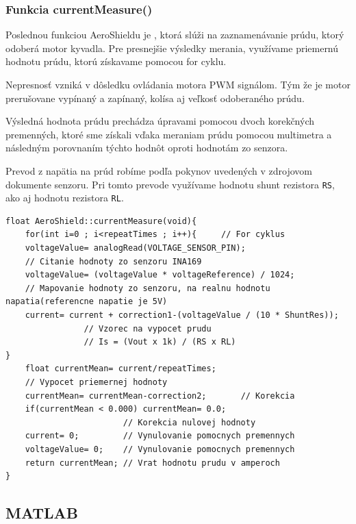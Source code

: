 	
\subsubsection{Funkcia currentMeasure()}	
	
Poslednou funkciou AeroShieldu je , ktorá slúži na zaznamenávanie prúdu, ktorý odoberá motor kyvadla. Pre presnejšie výsledky merania, využívame priemernú hodnotu prúdu, ktorú získavame pomocou for cyklu. 

Nepresnosť vzniká v dôsledku ovládania motora PWM signálom. Tým že je motor prerušovane vypínaný a zapínaný, kolísa aj veľkosť odoberaného prúdu. 

Výsledná hodnota prúdu prechádza úpravami pomocou dvoch korekčných premenných, ktoré sme získali vďaka meraniam prúdu pomocou multimetra a následným porovnaním týchto hodnôt oproti hodnotám zo senzora. 

Prevod z napätia na prúd robíme podľa pokynov uvedených v zdrojovom dokumente senzoru. Pri tomto prevode využívame hodnotu shunt rezistora \verb|RS|, ako aj hodnotu rezistora \verb|RL|. 
  
	
\begin{lstlisting}[caption={Zdrojový kód funkcie currentMeasure.},captionpos=b]	
float AeroShield::currentMeasure(void){  
	for(int i=0 ; i<repeatTimes ; i++){     // For cyklus
	voltageValue= analogRead(VOLTAGE_SENSOR_PIN);     
	// Citanie hodnoty zo senzoru INA169 
	voltageValue= (voltageValue * voltageReference) / 1024;    
	// Mapovanie hodnoty zo senzoru, na realnu hodnotu napatia(referencne napatie je 5V)
	current= current + correction1-(voltageValue / (10 * ShuntRes));    
                // Vzorec na vypocet prudu
                // Is = (Vout x 1k) / (RS x RL)
}                                                                         	
	float currentMean= current/repeatTimes;   
	// Vypocet priemernej hodnoty  
	currentMean= currentMean-correction2;       // Korekcia
	if(currentMean < 0.000) currentMean= 0.0;                 
	                    // Korekcia nulovej hodnoty
	current= 0;         // Vynulovanie pomocnych premennych   
	voltageValue= 0;    // Vynulovanie pomocnych premennych   
	return currentMean; // Vrat hodnotu prudu v amperoch
}
\end{lstlisting}
	
\subsection{MATLAB}	
\label{matlabik}
	
